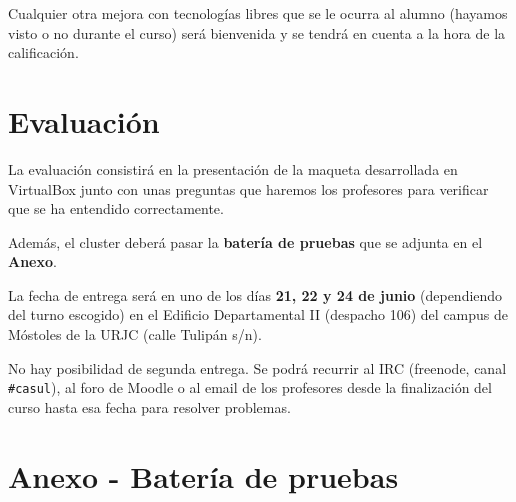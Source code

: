 \documentclass[a4paper,10pt]{article}
\begin{document}
Cualquier otra mejora con tecnologías libres que se le ocurra al alumno (hayamos visto o no durante el curso) será bienvenida y se tendrá en cuenta a la hora de la calificación.


\section{Evaluación}

La evaluación consistirá en la presentación de la maqueta desarrollada en VirtualBox junto con unas preguntas que haremos los profesores para verificar que se ha entendido correctamente.

Además, el cluster deberá pasar la \textbf{batería de pruebas} que se adjunta en el \textbf{Anexo}.

La fecha de entrega será en uno de los días \textbf{21, 22 y 24 de junio} (dependiendo del turno escogido) en el Edificio Departamental II (despacho 106) del campus de Móstoles de la URJC (calle Tulipán s/n).

No hay posibilidad de segunda entrega. Se podrá recurrir al IRC (freenode, canal \texttt{\#casul}), al foro de Moodle o al email de los profesores desde la finalización del curso hasta esa fecha para resolver problemas.

\bigskip

\section*{Anexo - Batería de pruebas}

\footnotesize
\end{document}

